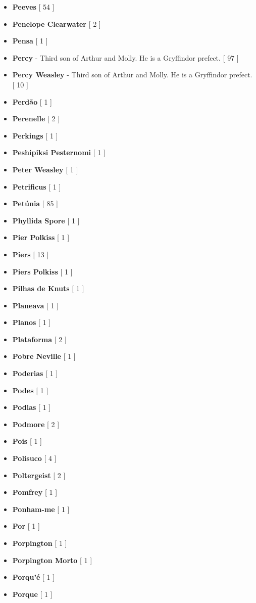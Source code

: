 \documentclass[a4paper]{article}
\begin{document}
\begin{itemize}
	\item \textbf{Peeves} [ 54 ]
	\item \textbf{Penelope Clearwater} [ 2 ]
	\item \textbf{Pensa} [ 1 ]
	\item \textbf{Percy} - Third son of Arthur and Molly. He is a Gryffindor prefect. [ 97 ]
	\item \textbf{Percy Weasley} - Third son of Arthur and Molly. He is a Gryffindor prefect. [ 10 ]
	\item \textbf{Perdão} [ 1 ]
	\item \textbf{Perenelle} [ 2 ]
	\item \textbf{Perkings} [ 1 ]
	\item \textbf{Peshipiksi Pesternomi} [ 1 ]
	\item \textbf{Peter Weasley} [ 1 ]
	\item \textbf{Petrificus} [ 1 ]
	\item \textbf{Petúnia} [ 85 ]
	\item \textbf{Phyllida Spore} [ 1 ]
	\item \textbf{Pier Polkiss} [ 1 ]
	\item \textbf{Piers} [ 13 ]
	\item \textbf{Piers Polkiss} [ 1 ]
	\item \textbf{Pilhas de Knuts} [ 1 ]
	\item \textbf{Planeava} [ 1 ]
	\item \textbf{Planos} [ 1 ]
	\item \textbf{Plataforma} [ 2 ]
	\item \textbf{Pobre Neville} [ 1 ]
	\item \textbf{Poderias} [ 1 ]
	\item \textbf{Podes} [ 1 ]
	\item \textbf{Podias} [ 1 ]
	\item \textbf{Podmore} [ 2 ]
	\item \textbf{Pois} [ 1 ]
	\item \textbf{Polisuco} [ 4 ]
	\item \textbf{Poltergeist} [ 2 ]
	\item \textbf{Pomfrey} [ 1 ]
	\item \textbf{Ponham-me} [ 1 ]
	\item \textbf{Por} [ 1 ]
	\item \textbf{Porpington} [ 1 ]
	\item \textbf{Porpington Morto} [ 1 ]
	\item \textbf{Porqu'é} [ 1 ]
	\item \textbf{Porque} [ 1 ]

\end{itemize}
\end{document}
